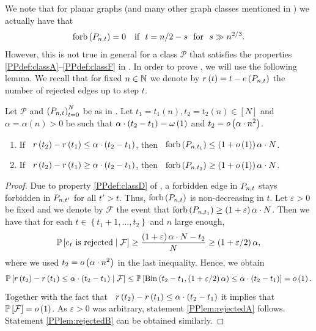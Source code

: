 We note that for planar graphs (and many other graph classes mentioned in ) we actually have that \whp\ 
\begin{align*}
\operatorname{forb}\left(P_{n,t}\right)=0 \quad \text{if }~ t=n/2-s ~\text{ for }~ s\gg n^{2/3}.
\end{align*}
However, this is not true in general for a class $\mathcal{P}$ that satisfies the properties \ref{PPdef:classA}--\ref{PPdef:classF} in . In order to prove , we will use the following lemma. We recall that for fixed $n\in\mathbb{N}$ we denote by $r\left(t\right)=t-e\left({P_{n,t}}\right)$ the number of rejected edges up to step $t$.
\begin{lem}\label{PPlem:rejected}
Let $\mathcal{P}$ and $\left(P_{n,t}\right)_{t=0}^{N}$ be as in . Let $t_1=t_1(n), t_2=t_2(n)\in \left[N\right]$ and $\alpha=\alpha(n)>0$ be such that $\alpha \cdot \left(t_2-t_1\right)=\omega\left(1\right)$ and $t_2=o\left(\alpha \cdot n^2\right)$. 
\begin{enumerate}
\item\label{PPlem:rejectedA}
If \whp\ $r\left(t_2\right)-r\left(t_1\right)\leq \alpha\cdot\left(t_2-t_1\right)$, then \whp\ $\operatorname{forb}\left(P_{n,t_1}\right)\leq \left(1+o\left(1\right)\right)\alpha \cdot N$.
\item\label{PPlem:rejectedB}
If \whp\ $r\left(t_2\right)-r\left(t_1\right)\geq \alpha \cdot \left(t_2-t_1\right)$, then \whp\ $\operatorname{forb}\left(P_{n,t_2}\right)\geq \left(1+o\left(1\right)\right)\alpha \cdot N$.
\end{enumerate}
\end{lem}
\begin{proof}
Due to property \ref{PPdef:classD} of , a forbidden edge in $P_{n,t}$ stays forbidden in $P_{n,t'}$ for all $t'>t$. Thus, $\operatorname{forb}\left(P_{n,t}\right)$ is non-decreasing in $t$. Let $\varepsilon>0$ be fixed and we denote by $\mathcal{F}$ the event that $\operatorname{forb}\left(P_{n,t_1}\right)\geq \left(1+\varepsilon\right)\alpha \cdot N$. Then we have that for each $t\in\left\{t_1+1, \ldots, t_2\right\}$ and $n$ large enough,
\begin{align*}
\mathbb{P}\left[e_t \text{ is rejected} \;\middle|\; \mathcal{F}\right]\geq \frac{\left(1+\varepsilon\right)\alpha \cdot N-t_2}{N}\geq \left(1+\varepsilon/2\right)\alpha,
\end{align*}
where we used $t_2=o\left(\alpha \cdot n^2\right)$ in the last inequality. Hence, we obtain
\begin{align*}
\mathbb{P}\left[r\left(t_2\right)-r\left(t_1\right)\leq \alpha \cdot\left(t_2-t_1\right) \;\middle|\; \mathcal{F}\right]\leq \mathbb{P}\left[\operatorname{Bin}\left(t_2-t_1,\left(1+\varepsilon/2\right)\alpha\right)\leq \alpha \cdot \left(t_2-t_1\right)\right]=o\left(1\right).
\end{align*}
Together with the fact that \whp\ $r\left(t_2\right)-r\left(t_1\right)\leq \alpha \cdot\left(t_2-t_1\right)$ it implies that $\mathbb{P}\left[\mathcal{F}\right]=o\left(1\right)$. As $\varepsilon>0$ was arbitrary, statement \ref{PPlem:rejectedA} follows. Statement \ref{PPlem:rejectedB} can be obtained similarly.
\end{proof}

